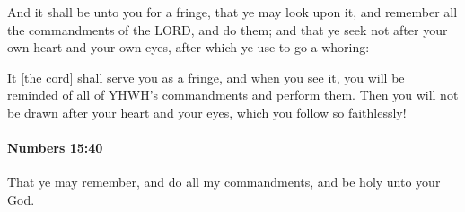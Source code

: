 			And it shall be unto you for a fringe, that ye may look upon it, and remember all the commandments of the LORD, and do them; and that ye seek not after your own heart and your own eyes, after which ye use to go a whoring:

			\begin{framed}
			\scriptsize
				\begin{compactdesc}
					\item[AB 1993 388] It [the cord] shall serve you as a fringe, and when you see it, you will be reminded of all of YHWH's commandments and perform them. Then you will not be drawn after your heart and your eyes, which you follow so faithlessly!
				\end{compactdesc}
			\end{framed}

		\paragraph{Numbers 15:40} %
			\label{NUMBERS-15-40}

			That ye may remember, and do all my commandments, and be holy unto your God.


